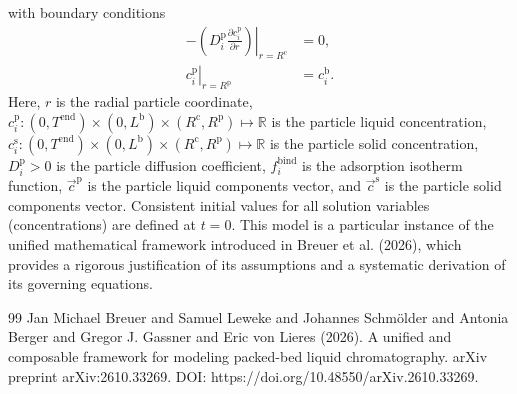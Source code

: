 \documentclass{article}
\begin{document}
with boundary conditions
\begin{align}
    - \left. \left( D^{\mathrm{p}}_{i} \frac{\partial c^{\mathrm{p}}_{i}}{\partial r} \right) \right|_{r=R^{\mathrm{c}}}
    &= 0,
    \\
    \left. c^{\mathrm{p}}_{i} \right|_{r = R^{\mathrm{p}}}
    &= c^{\mathrm{b}}_{i}.
\end{align}
Here, $r$ is the radial particle coordinate, $c^{\mathrm{p}}_{i}\colon (0, T^{\mathrm{end}}) \times (0, L^{\mathrm{b}})\times (R^{\mathrm{c}}, R^{\mathrm{p}}) \mapsto \mathbb{R}$ is the particle liquid concentration, $c^{\mathrm{s}}_{i}\colon (0, T^{\mathrm{end}}) \times (0, L^{\mathrm{b}})\times (R^{\mathrm{c}}, R^{\mathrm{p}}) \mapsto \mathbb{R}$ is the particle solid concentration, $D^{\mathrm{p}}_{i}> 0$ is the particle diffusion coefficient, $f^{\mathrm{bind}}_{i}$ is the adsorption isotherm function, $\vec{c}^{\mathrm{p}}$ is the particle liquid components vector, and $\vec{c}^{\mathrm{s}}$ is the particle solid components vector.
Consistent initial values for all solution variables (concentrations) are defined at $t = 0$.
This model is a particular instance of the unified mathematical framework introduced in Breuer et al. (2026), which provides a rigorous justification of its assumptions and a systematic derivation of its governing equations.
\begin{thebibliography}{99}
     Jan Michael Breuer and Samuel Leweke and Johannes Schmölder and Antonia Berger and Gregor J. Gassner and Eric von Lieres (2026). A unified and composable framework for modeling packed-bed liquid chromatography. arXiv preprint arXiv:2610.33269. DOI: https://doi.org/10.48550/arXiv.2610.33269.
\end{thebibliography}
\end{document}
